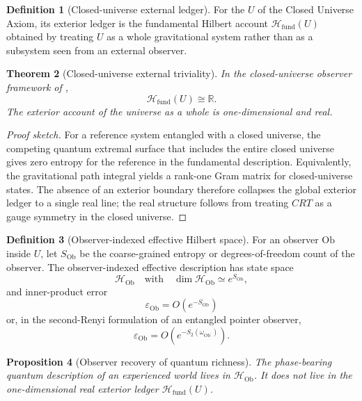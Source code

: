 \documentclass[11pt]{article}
\theoremstyle{plain}
\newtheorem{theorem}{Theorem}[section]
\newtheorem{proposition}[theorem]{Proposition}
\theoremstyle{definition}
\newtheorem{definition}[theorem]{Definition}
\theoremstyle{remark}
\newenvironment{proofsketch}{\begin{proof}[Proof sketch]}{\end{proof}}
\begin{document}
\begin{definition}[Closed-universe external ledger]
For the \(U\) of the Closed Universe Axiom, its exterior ledger is the fundamental Hilbert account \(\mathcal{H}_{\mathrm{fund}}(U)\) obtained by treating \(U\) as a whole gravitational system rather than as a subsystem seen from an external observer.
\end{definition}

\begin{theorem}[Closed-universe external triviality]
In the closed-universe observer framework of \cite{harlow-observers},
\[
\mathcal{H}_{\mathrm{fund}}(U)\cong \mathbb{R}.
\]
The exterior account of the universe as a whole is one-dimensional and real.
\end{theorem}

\begin{proofsketch}
For a reference system entangled with a closed universe, the competing quantum extremal surface that includes the entire closed universe gives zero entropy for the reference in the fundamental description. Equivalently, the gravitational path integral yields a rank-one Gram matrix for closed-universe states. The absence of an exterior boundary therefore collapses the global exterior ledger to a single real line; the real structure follows from treating \(CRT\) as a gauge symmetry in the closed universe.
\end{proofsketch}

\begin{definition}[Observer-indexed effective Hilbert space]
For an observer \(\mathrm{Ob}\) inside \(U\), let \(S_{\mathrm{Ob}}\) be the coarse-grained entropy or degrees-of-freedom count of the observer. The observer-indexed effective description has state space
\[
\mathcal{H}_{\mathrm{Ob}}
\quad\text{with}\quad
\dim\mathcal{H}_{\mathrm{Ob}}\simeq e^{S_{\mathrm{Ob}}},
\]
and inner-product error
\[
\varepsilon_{\mathrm{Ob}}=O(e^{-S_{\mathrm{Ob}}})
\]
or, in the second-Renyi formulation of an entangled pointer observer,
\[
\varepsilon_{\mathrm{Ob}}=O(e^{-S_2(\omega_{\mathrm{Ob}^{\prime}})}).
\]
\end{definition}

\begin{proposition}[Observer recovery of quantum richness]
The phase-bearing quantum description of an experienced world lives in \(\mathcal{H}_{\mathrm{Ob}}\). It does not live in the one-dimensional real exterior ledger \(\mathcal{H}_{\mathrm{fund}}(U)\).
\end{proposition}
\end{document}
